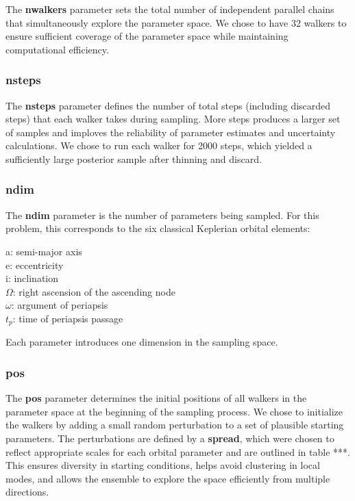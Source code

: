 \documentclass[linenumbers,trackchanges,astrosymb,]{aastex7}
\begin{document}
The \textbf{nwalkers} parameter sets the total number of independent parallel chains that simultaneously explore the parameter space. We chose to have 32 walkers to ensure sufficient coverage of the parameter space while maintaining computational efficiency. 

\subsubsection{nsteps}

The \textbf{nsteps} parameter defines the number of total steps (including discarded steps) that each walker takes during sampling. More steps produces a larger set of samples and imploves the reliability of parameter estimates and uncertainty calculations. We chose to run each walker for 2000 steps, which yielded a sufficiently large posterior sample after thinning and discard. 

\subsubsection{ndim}

The \textbf{ndim} parameter is the number of parameters being sampled. For this problem, this corresponds to the six classical Keplerian orbital elements:
    
    \begin{center}
        a: semi-major axis \\
	e: eccentricity \\ 
	i: inclination \\ 
	$\Omega$: right ascension of the ascending node \\
	$\omega$: argument of periapsis \\
	$t_p$: time of periapsis passage
    \end{center}
    
Each parameter introduces one dimension in the sampling space.

\subsubsection{pos}

The \textbf{pos} parameter determines the initial positions of all walkers in the parameter space at the beginning of the sampling process. We chose to initialize the walkers by adding a small random perturbation to a set of plausible starting parameters. The perturbations are defined by a \textbf{spread}, which were chosen to reflect appropriate scales for each orbital parameter and are outlined in table ***. This ensures diversity in starting conditions, helps avoid clustering in local modes, and allows the ensemble to explore the space efficiently from multiple directions.
\end{document}
